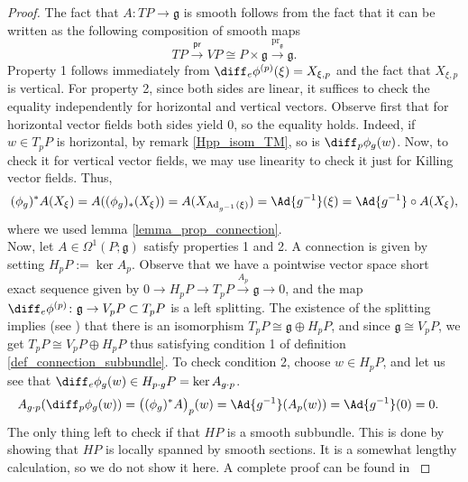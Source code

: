 \begin{proof}
    The fact that \(A\colon TP \to \mathfrak{g}\) is smooth follows from the fact that it can be written as the following composition of smooth maps
    \[
    TP \xrightarrow{\mathsf{pr}} VP \cong P \times \mathfrak{g} \xrightarrow{\mathrm{pr}_{\mathfrak{g}}} \mathfrak{g}.
    \]
    Property 1 follows immediately from \(\diff_e\phi^{(p)}(\xi)=X_{\xi,p}\) and the fact that \(X_{\xi,p}\) is vertical. For property 2, since both sides are linear, it suffices to check the equality independently for horizontal and vertical vectors. Observe first that for horizontal vector fields both sides yield \(0\), so the equality holds. Indeed, if \(w\in T_pP\) is horizontal, by remark \ref{Hpp_isom_TM}, so is \(\diff_p\phi_g(w)\). Now, to check it for vertical vector fields, we may use linearity to check it just for Killing vector fields. Thus,
    \begin{align}
        (\phi_g)^*A(X_\xi)=A((\phi_g)_*(X_\xi))=A(X_{\mathrm{Ad}_{g^{-1}}(\xi)})=\Ad{g^{-1}}(\xi)=\Ad{g^{-1}}\circ A(X_\xi),
    \end{align}
    where we used lemma \ref{lemma_prop_connection}. \\

    Now, let \(A \in \Omega^1(P; \mathfrak{g})\) satisfy properties 1 and 2. A connection is given by setting \(H_pP:=\ker A_p\). Observe that we have a pointwise vector space short exact sequence given by \(0 \to H_pP\to T_pP \xrightarrow{A_p} \mathfrak{g} \to 0\), and the map \(\diff_e\phi^{(p)}\colon \mathfrak{g} \to V_pP \subset T_pP\) is a left splitting. The existence of the splitting implies (see \parencite[Prop. 27.20]{tu2017differential}) that there is an isomorphism \(T_pP \cong \mathfrak{g}\oplus H_pP\), and since \(\mathfrak{g} \cong V_pP\), we get \(T_pP \cong V_pP \oplus H_pP\) thus satisfying condition 1 of definition \ref{def_connection_subbundle}. To check condition 2, choose \(w \in H_pP\), and let us see that \(\diff_e\phi_g(w) \in H_{p\cdot g} P=\ker A_{g \cdot p}\). 
    \begin{align*}
        A_{g\cdot p}(\diff_p\phi_g(w))&=\big((\phi_g)^* A\big)_p(w)=\Ad{g^{-1}}(A_p(w))=\Ad{g^{-1}}(0)=0.
    \end{align*} 
    The only thing left to check if that \(HP\) is a smooth subbundle. This is done by showing that \(HP\) is locally spanned by smooth sections. It is a somewhat lengthy calculation, so we do not show it here. A complete proof can be found in \parencite[Prop. 28.5]{tu2017differential}
\end{proof}
